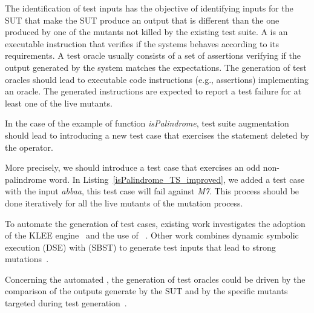 The identification of test inputs has the objective of identifying inputs for the SUT that make the SUT produce an output that is different than the one produced by one of the mutants not killed by the existing test suite. 
A  is an executable instruction that verifies if the systems behaves according to its requirements. 
A test oracle usually consists of a set of assertions verifying if the output generated by the system matches the expectations.
The generation of test oracles should lead to executable code instructions (e.g., assertions) implementing an oracle. The generated instructions are expected to report a test failure for at least one of the live mutants.


In the case of the example of function \textit{isPalindrome}, test suite augmentation should lead to introducing a new test case that exercises the statement deleted by the operator. 



More precisely, we should introduce a test case that exercises an odd non-palindrome word. In Listing~\ref{isPalindrome_TS_improved}, we added a test case with the input \textit{abbaa}, this test case will fail against \textit{M7}. This process should be done iteratively for all the live mutants of the mutation process. 
 

To automate the generation of test cases, existing work investigates the adoption of the KLEE  engine~\cite{holling2016nequivack} and the use of ~\cite{riener2011test}. Other work combines dynamic symbolic execution (DSE) with  (SBST) to generate test inputs that lead to strong mutations~\cite{harman2011strong}. 


Concerning the automated , 
the generation of test oracles could be driven by the comparison of the outputs generate by the SUT and by the specific mutants targeted during test generation~\cite{Staats2012}.



